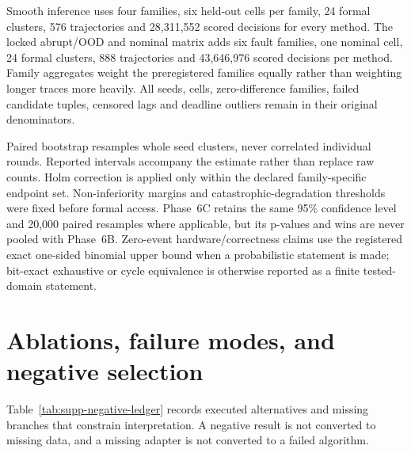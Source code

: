 \documentclass[11pt]{article}
\begin{document}
Smooth inference uses four families, six held-out cells per family, 24 formal
clusters, 576 trajectories and 28,311,552 scored decisions for every method.
The locked abrupt/OOD and nominal matrix adds six fault families, one nominal
cell, 24 formal clusters, 888 trajectories and 43,646,976 scored decisions per
method.  Family aggregates weight the preregistered families equally rather
than weighting longer traces more heavily.  All seeds, cells, zero-difference
families, failed candidate tuples, censored lags and deadline outliers remain in
their original denominators.

Paired bootstrap resamples whole seed clusters, never correlated individual
rounds.  Reported intervals accompany the estimate rather than replace raw
counts.  Holm correction is applied only within the declared family-specific
endpoint set.  Non-inferiority margins and catastrophic-degradation thresholds
were fixed before formal access.  Phase~6C retains the same 95\% confidence
level and 20,000 paired resamples where applicable, but its p-values and wins
are never pooled with Phase~6B.  Zero-event hardware/correctness claims use the
registered exact one-sided binomial upper bound when a probabilistic statement
is made; bit-exact exhaustive or cycle equivalence is otherwise reported as a
finite tested-domain statement.

\section{Ablations, failure modes, and negative selection}

Table~\ref{tab:supp-negative-ledger} records executed alternatives and missing
branches that constrain interpretation.  A negative result is not converted
to missing data, and a missing adapter is not converted to a failed algorithm.
\end{document}

